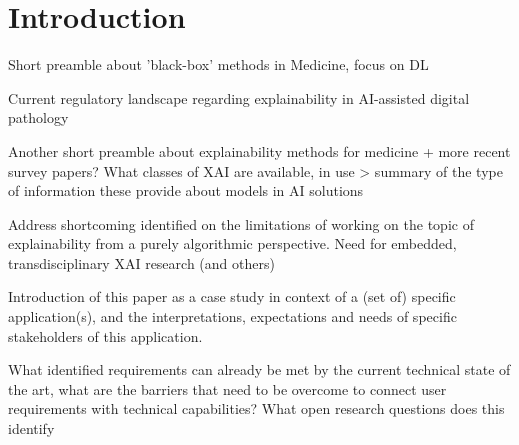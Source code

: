 \section{Introduction}
\label{sec:Introduction}

Short preamble about 'black-box' methods in Medicine, focus on DL \cite{piccialli_survey_2021}

Current regulatory landscape regarding explainability in AI-assisted digital pathology

Another short preamble about explainability methods for medicine \cite{poceviciute_survey_2020} + more recent survey papers? What classes of XAI are available, in use > summary of the type of information these provide about models in AI solutions

Address shortcoming identified  on the limitations of working on the topic of explainability from a purely algorithmic perspective. Need for embedded, transdisciplinary XAI research \cite{tjoa_survey_2020} (and others)

Introduction of this paper as a case study in context of a (set of) specific application(s), and the interpretations, expectations and needs of specific stakeholders of this application.

What identified requirements can already be met by the current technical state of the art, what are the barriers that need to be overcome to connect user requirements with technical capabilities? What open research questions does this identify


